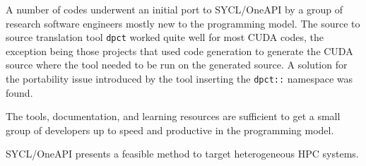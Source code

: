 
A number of codes underwent an initial port to SYCL/OneAPI by a group of research software engineers mostly new to the programming model.
The source to source translation tool \texttt{dpct} worked quite well for most CUDA codes, the exception being those projects that used code generation to generate the CUDA source where the tool needed to be run on the generated source.
A solution for the portability issue introduced by the tool inserting the \texttt{dpct::} namespace was found.

The tools, documentation, and learning resources are sufficient to get a small group of developers up to speed and productive in the programming model.

SYCL/OneAPI presents a feasible method to target heterogeneous HPC systems.
